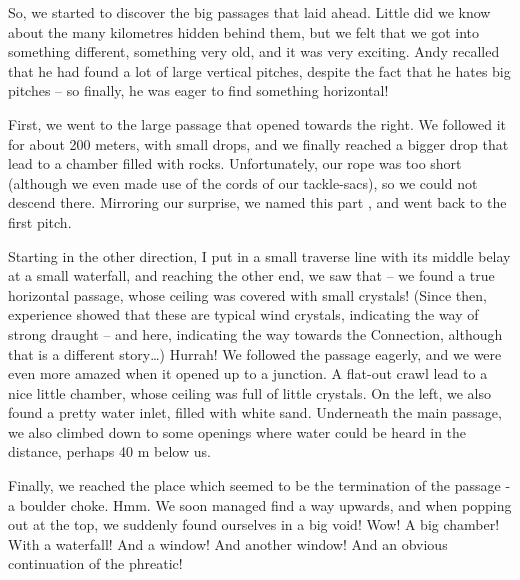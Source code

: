 So, we started to discover the big passages that laid ahead. Little did we know about the many kilometres hidden behind them, but we felt that we got into something different, something very old, and it was very exciting. Andy recalled that he had found a lot of large vertical pitches, despite the fact that he hates big pitches -- so finally, he was eager to find something horizontal!


First, we went to the large passage that opened towards the right. We followed it for about 200 meters, with small drops, and we finally reached a bigger drop that lead to a chamber filled with rocks.
Unfortunately, our rope was too short (although we even made use of the cords of our tackle-sacs), so we could not descend there. Mirroring our surprise, we named this part , and went back to the first pitch.

Starting in the other direction, I put in a small traverse line with its middle belay at a small waterfall, and reaching the other end, we saw
that  -- we found a true horizontal passage, whose ceiling was covered with small crystals! (Since then,
experience showed that these are typical wind crystals, indicating the way of strong draught -- and here, indicating the way towards the
Connection, although that is a different story\ldots{}) Hurrah! We followed the passage eagerly, and we were even more amazed when it
opened up to a junction. A flat-out crawl lead to a nice little chamber,
whose ceiling was full of little crystals. On the left, we also found a
pretty water inlet, filled with white sand. Underneath the main passage,
we also climbed down to some openings where water could be heard in the distance, perhaps 40 m below us.


Finally, we reached the place which seemed to be the termination of the
passage - a boulder choke. Hmm. We soon managed find a way upwards, and
when popping out at the top, we suddenly found ourselves in a big void!
Wow! A big chamber! With a waterfall! And a window! And another window!
And an obvious continuation of the phreatic!


